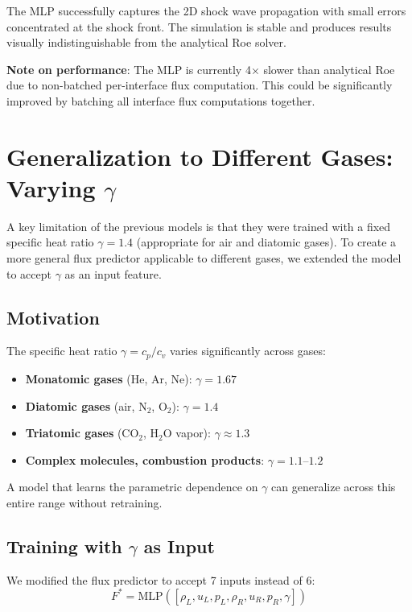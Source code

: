 \documentclass[11pt,a4paper]{article}
\begin{document}
The MLP successfully captures the 2D shock wave propagation with small errors concentrated at the shock front. The simulation is stable and produces results visually indistinguishable from the analytical Roe solver.

\textbf{Note on performance}: The MLP is currently 4$\times$ slower than analytical Roe due to non-batched per-interface flux computation. This could be significantly improved by batching all interface flux computations together.

\section{Generalization to Different Gases: Varying $\gamma$}

A key limitation of the previous models is that they were trained with a fixed specific heat ratio $\gamma = 1.4$ (appropriate for air and diatomic gases). To create a more general flux predictor applicable to different gases, we extended the model to accept $\gamma$ as an input feature.

\subsection{Motivation}

The specific heat ratio $\gamma = c_p/c_v$ varies significantly across gases:
\begin{itemize}
    \item \textbf{Monatomic gases} (He, Ar, Ne): $\gamma = 1.67$
    \item \textbf{Diatomic gases} (air, N$_2$, O$_2$): $\gamma = 1.4$
    \item \textbf{Triatomic gases} (CO$_2$, H$_2$O vapor): $\gamma \approx 1.3$
    \item \textbf{Complex molecules, combustion products}: $\gamma = 1.1$--$1.2$
\end{itemize}

A model that learns the parametric dependence on $\gamma$ can generalize across this entire range without retraining.

\subsection{Training with $\gamma$ as Input}

We modified the flux predictor to accept 7 inputs instead of 6:
\begin{equation}
    F^* = \text{MLP}([\rho_L, u_L, p_L, \rho_R, u_R, p_R, \gamma])
\end{equation}
\end{document}
